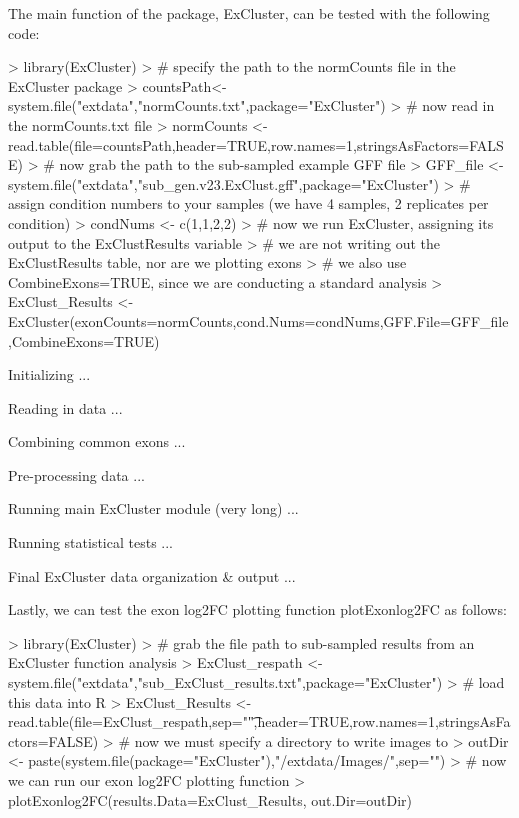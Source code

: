 \documentclass[12pt]{article}
\begin{document}
The main function of the package, ExCluster, can be tested with the following code:\\

\begin{scriptsize}
\begin{Schunk}
\begin{Sinput}
> library(ExCluster)
> # specify the path to the normCounts file in the ExCluster package
> countsPath<- system.file("extdata","normCounts.txt",package="ExCluster")
> # now read in the normCounts.txt file
> normCounts <- read.table(file=countsPath,header=TRUE,row.names=1,stringsAsFactors=FALSE)
> # now grab the path to the sub-sampled example GFF file
> GFF_file <- system.file("extdata","sub_gen.v23.ExClust.gff",package="ExCluster")
> # assign condition numbers to your samples (we have 4 samples, 2 replicates per condition)
> condNums <- c(1,1,2,2)
> # now we run ExCluster, assigning its output to the ExClustResults variable
> # we are not writing out the ExClustResults table, nor are we plotting exons
> # we also use CombineExons=TRUE, since we are conducting a standard analysis
> ExClust_Results <- ExCluster(exonCounts=normCounts,cond.Nums=condNums,GFF.File=GFF_file,CombineExons=TRUE)
\end{Sinput}
\begin{Soutput}
Initializing ...

Reading in data ...

Combining common exons ...

Pre-processing data ...

Running main ExCluster module (very long) ...

Running statistical tests ...

Final ExCluster data organization & output ...
\end{Soutput}
\end{Schunk}
\end{scriptsize}

Lastly, we can test the exon log2FC plotting function plotExonlog2FC as follows:\\

\begin{scriptsize}
\begin{Schunk}
\begin{Sinput}
> library(ExCluster)
> # grab the file path to sub-sampled results from an ExCluster function analysis
> ExClust_respath <- system.file("extdata","sub_ExClust_results.txt",package="ExCluster")
> # load this data into R
> ExClust_Results <- read.table(file=ExClust_respath,sep="\t",header=TRUE,row.names=1,stringsAsFactors=FALSE)
> # now we must specify a directory to write images to
> outDir <- paste(system.file(package="ExCluster"),"/extdata/Images/",sep="")
> # now we can run our exon log2FC plotting function
> plotExonlog2FC(results.Data=ExClust_Results, out.Dir=outDir)
\end{Sinput}
\end{Schunk}
\end{scriptsize}
\end{document}
